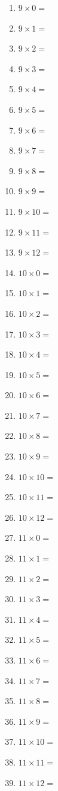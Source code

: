 \documentclass{article}
\begin{document}
\begin{multicols}{4}
\begin{enumerate}
\item $9 \times 0 =$
\item $9 \times 1 =$
\item $9 \times 2 =$
\item $9 \times 3 =$
\item $9 \times 4 =$
\item $9 \times 5 =$
\item $9 \times 6 =$
\item $9 \times 7 =$
\item $9 \times 8 =$
\item $9 \times 9 =$
\item $9 \times 10 =$
\item $9 \times 11 =$
\item $9 \times 12 =$

\item $10 \times 0 =$
\item $10 \times 1 =$
\item $10 \times 2 =$
\item $10 \times 3 =$
\item $10 \times 4 =$
\item $10 \times 5 =$
\item $10 \times 6 =$
\item $10 \times 7 =$
\item $10 \times 8 =$
\item $10 \times 9 =$
\item $10 \times 10 =$
\item $10 \times 11 =$
\item $10 \times 12 =$

\item $11 \times 0 =$
\item $11 \times 1 =$
\item $11 \times 2 =$
\item $11 \times 3 =$
\item $11 \times 4 =$
\item $11 \times 5 =$
\item $11 \times 6 =$
\item $11 \times 7 =$
\item $11 \times 8 =$
\item $11 \times 9 =$
\item $11 \times 10 =$
\item $11 \times 11 =$
\item $11 \times 12 =$


\end{enumerate}
\end{multicols}
\end{document}
